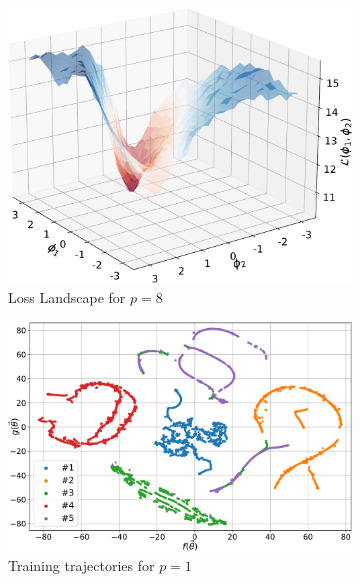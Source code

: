 \begin{figure}[htp]
\begin{subfigure}[b]{0.32\linewidth}
    \end{subfigure}
    \begin{subfigure}[b]{0.32\linewidth}
        \includegraphics[width=\textwidth]{figures/qleet/loss_landscape_p3.pdf}
        \caption{Loss Landscape for $p=8$\label{fig:loss-p8}}
    \end{subfigure}%
    \hfill\newline
    \begin{subfigure}[b]{0.32\linewidth}
        \includegraphics[width=\textwidth]{figures/qleet/training_trajectory_p1.pdf}
        \caption{Training trajectories for $p=1$\label{fig:train-p1}}
    \end{subfigure}
    \begin{subfigure}[b]{0.32\linewidth}

\end{subfigure}
\end{figure}
